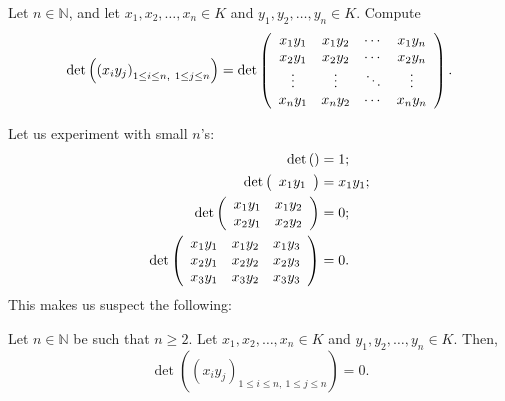 \begin{example}
Let $n\in\mathbb{N}$, and let $x_{1},x_{2},\ldots,x_{n}\in K$ and $y_{1}%
,y_{2},\ldots,y_{n}\in K$. Compute%
\[
\det\left(  \left(  x_{i}y_{j}\right)  _{1\leq i\leq n,\ 1\leq j\leq
n}\right)  =\det\left(
\begin{array}
[c]{cccc}%
x_{1}y_{1} & x_{1}y_{2} & \cdots & x_{1}y_{n}\\
x_{2}y_{1} & x_{2}y_{2} & \cdots & x_{2}y_{n}\\
\vdots & \vdots & \ddots & \vdots\\
x_{n}y_{1} & x_{n}y_{2} & \cdots & x_{n}y_{n}%
\end{array}
\right)  .
\]

\end{example}

Let us experiment with small $n$'s:%
\begin{align*}
\det\left(  {}\right)   &  =1;\\
\det\left(
\begin{array}
[c]{c}%
x_{1}y_{1}%
\end{array}
\right)   &  =x_{1}y_{1};\\
\det\left(
\begin{array}
[c]{cc}%
x_{1}y_{1} & x_{1}y_{2}\\
x_{2}y_{1} & x_{2}y_{2}%
\end{array}
\right)   &  =0;\\
\det\left(
\begin{array}
[c]{ccc}%
x_{1}y_{1} & x_{1}y_{2} & x_{1}y_{3}\\
x_{2}y_{1} & x_{2}y_{2} & x_{2}y_{3}\\
x_{3}y_{1} & x_{3}y_{2} & x_{3}y_{3}%
\end{array}
\right)   &  =0.
\end{align*}
This makes us suspect the following:

\begin{proposition}
\label{prop.det.xiyj}Let $n\in\mathbb{N}$ be such that $n\geq2$. Let
$x_{1},x_{2},\ldots,x_{n}\in K$ and $y_{1},y_{2},\ldots,y_{n}\in K$. Then,%
\[
\det\left(  \left(  x_{i}y_{j}\right)  _{1\leq i\leq n,\ 1\leq j\leq
n}\right)  =0.
\]

\end{proposition}

